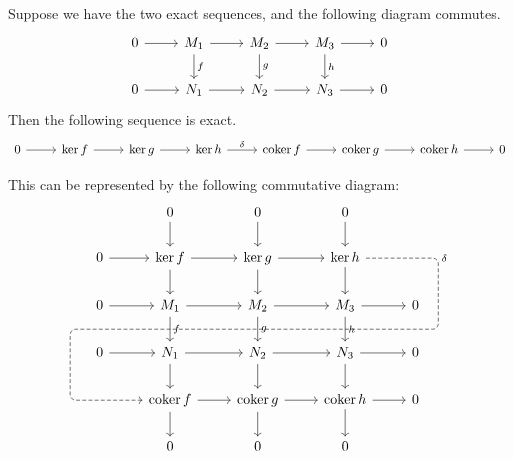 \begin{lemma}
    Suppose we have the two exact sequences,
    and the following diagram commutes.
    \begin{equation*}
        \begin{tikzcd}
            0 \arrow{r} & M_1 \arrow{d}{f} \arrow{r} &
            M_2 \arrow{d}{g} \arrow{r} & M_3 \arrow{d}{h} \arrow{r} & 0 \\
            0 \arrow{r} & N_1 \arrow{r} & N_2 \arrow{r} & N_3 \arrow{r} & 0
        \end{tikzcd}
    \end{equation*}
    Then the following sequence is exact.
    \begin{equation*}
        \begin{tikzcd}
            0 \arrow{r} & \ker f \arrow{r} & \ker g \arrow{r} & \ker h \arrow{r}{\delta} &
            \coker f \arrow{r} & \coker g \arrow{r} & \coker h \arrow{r} & 0
        \end{tikzcd}
    \end{equation*}

    This can be represented by the following commutative diagram:
    \begin{equation*}
        \begin{tikzcd}
            & 0 \arrow{d} & 0 \arrow{d} & 0 \arrow{d} \\
            0 \arrow{r} & \ker f \arrow{d} \arrow{r} &
            \ker g \arrow{d} \arrow{r} \arrow[ddd, phantom, ""{coordinate, name=Z}] & \ker h \arrow{d}
            \arrow[rounded corners, dashrightarrow, to path={
                -- ([xshift=12ex]\tikztostart.east)
                |- (Z) [near end]\tikztonodes
                -| ([xshift=-12ex]\tikztotarget.west)
                -- (\tikztotarget)
            }]{dddll}[at start]{\delta} \\
            0 \arrow{r} & M_1 \arrow{d}{f} \arrow{r} &
            M_2 \arrow{d}{g} \arrow{r} & M_3 \arrow{d}{h} \arrow{r} & 0 \\
            0 \arrow{r} & N_1 \arrow{d} \arrow{r} &
            N_2 \arrow{d} \arrow{r} & N_3 \arrow{d} \arrow{r} & 0 \\
            & \coker f \arrow{d} \arrow{r} &
            \coker g \arrow{d} \arrow{r} & \coker h \arrow{d} \arrow{r} & 0 \\
            & 0 & 0 & 0
        \end{tikzcd}
    \end{equation*}
\end{lemma}
